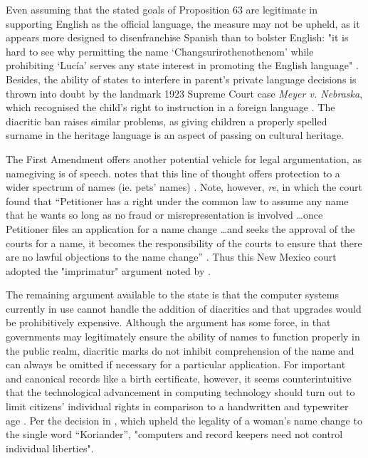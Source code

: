 Even assuming that the stated goals of Proposition 63 are legitimate in
supporting English as the official language, the measure may not be upheld, as
it appears more designed to disenfranchise Spanish than to bolster English: "it
is hard to see why permitting the name `Changsurirothenothenom' while
prohibiting `Lucía' serves any state interest in promoting the English
language" \parencite[189]{larson11}. Besides, the ability of states to
interfere in parent's private language decisions is thrown into doubt by the
landmark 1923 Supreme Court case \textit{Meyer v. Nebraska}, which recognised
the child's right to instruction in a foreign language \parencite{larson11}
\parencite{baron92}. The diacritic ban raises similar problems, as giving
children a properly spelled surname in the heritage language is an aspect of
passing on cultural heritage.

The First Amendment offers another potential vehicle for legal argumentation,
as namegiving is of speech. \textcite{larson11} notes that this line of thought
offers protection to a wider spectrum of names (ie. pets' names)
\parencite{larson11}. Note, however, \textit{re}, in which the court found that
``Petitioner has a right under the common law to assume any name that he wants
so long as no fraud or misrepresentation is involved \dots once Petitioner
files an application for a name change \dots and seeks the approval of the
courts for a name, it becomes the responsibility of the courts to ensure that
there are no lawful objections to the name change'' \parencite{variable08}
\parencite[413]{heymann11}. Thus this New Mexico court adopted the "imprimatur"
argument noted by \textcite{heymann11}.

The remaining argument available to the state is that the computer systems
currently in use cannot handle the addition of diacritics and that upgrades
would be prohibitively expensive. Although the argument has some force, in that
governments may legitimately ensure the ability of names to function properly
in the public realm, diacritic marks do not inhibit comprehension of the name
and can always be omitted if necessary for a particular application. For
important and canonical records like a birth certificate, however, it seems
counterintuitive that the technological advancement in computing technology
should turn out to limit citizens' individual rights in comparison to a
handwritten and typewriter age \parencite[191]{larson11}. Per the decision in
\parencite{ferner96}, which upheld the legality of a woman's name change to the
single word ``Koriander'', "computers and record keepers need not control
individual liberties".

